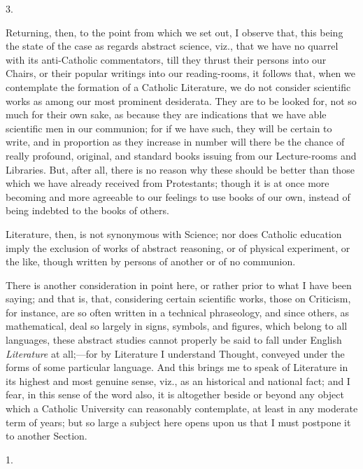 3.

Returning, then, to the point from which we set out, I observe
that, this being the state of the case as regards abstract science,
viz., that we have no quarrel with its anti-Catholic commentators,
till they thrust their persons into our Chairs, or their popular
writings into our reading-rooms, it follows that, when we contemplate
the formation of a Catholic Literature, we do not consider scientific
works as among our most prominent desiderata. They are to be looked
for, not so much for their own sake, as because they are indications
that we have able scientific men in our communion; for if we have
such, they will be certain to write, and in proportion as they
increase in number will there be the chance of really profound,
original, and standard books issuing from our Lecture-rooms and
Libraries. But, after all, there is no reason why these should be
better than those which we have already received from Protestants;
though it is at once more becoming and more agreeable to our feelings
to use books of our own, instead of being indebted to the books of
others.

Literature, then, is not synonymous with Science; nor does Catholic
education imply the exclusion of works of abstract reasoning, or of
physical experiment, or the like, though written by persons of another
or of no communion.

There is another consideration in point here, or rather prior to
what I have been saying; and that is, that, considering certain
scientific works, those on Criticism, for instance, are so often
written in a technical phraseology, and since others, as mathematical,
deal so largely in signs, symbols, and figures, which belong to all
languages, these abstract studies cannot properly be said to fall under English \emph{Literature} at all;—for by
Literature I understand Thought, conveyed under the forms of some
particular language. And this brings me to speak of Literature in its
highest and most genuine sense, viz., as an historical and national
fact; and I fear, in this sense of the word also, it is altogether
beside or beyond any object which a Catholic University can reasonably
contemplate, at least in any moderate term of years; but so large a
subject here opens upon us that I must postpone it to another Section.


1.

